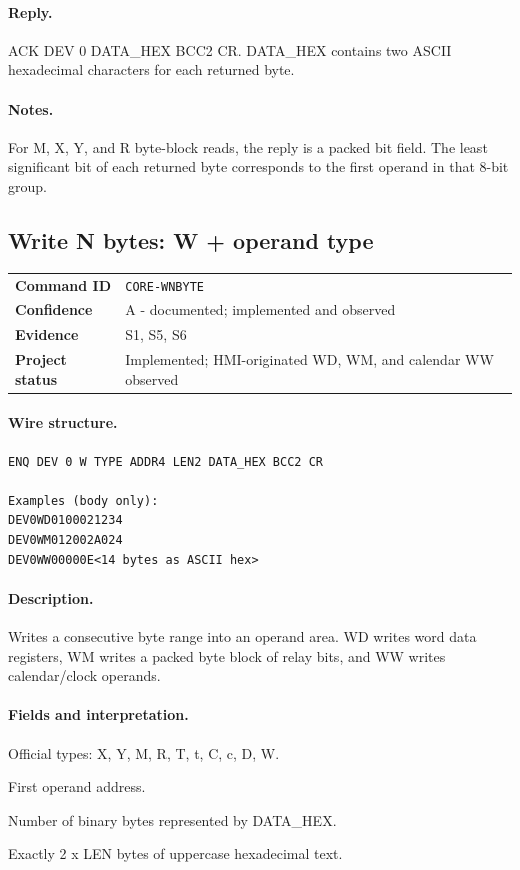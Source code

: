 \documentclass[10pt,letterpaper]{article}
\begin{document}
\paragraph{Reply.} ACK DEV 0 DATA\_HEX BCC2 CR. DATA\_HEX contains two ASCII hexadecimal characters for each returned byte.
\paragraph{Notes.} For M, X, Y, and R byte-block reads, the reply is a packed bit field. The least significant bit of each returned byte corresponds to the first operand in that 8-bit group.

\subsection{Write N bytes: W + operand type}
\begin{tabularx}{\textwidth}{@{}>{\bfseries}p{2.8cm}X@{}}
Command ID & \texttt{CORE-WNBYTE} \\
Confidence & A - documented; implemented and observed \\
Evidence & S1, S5, S6 \\
Project status & Implemented; HMI-originated WD, WM, and calendar WW observed \\
\end{tabularx}
\vspace{0.35em}
\paragraph{Wire structure.}
\begin{Verbatim}[breaklines=true,breakanywhere=true,fontsize=\small]
ENQ DEV 0 W TYPE ADDR4 LEN2 DATA_HEX BCC2 CR

Examples (body only):
DEV0WD0100021234
DEV0WM012002A024
DEV0WW00000E<14 bytes as ASCII hex>
\end{Verbatim}
\paragraph{Description.} Writes a consecutive byte range into an operand area. WD writes word data registers, WM writes a packed byte block of relay bits, and WW writes calendar/clock operands.
\paragraph{Fields and interpretation.}
\begin{description}[style=nextline,leftmargin=3.2cm,labelwidth=3.0cm,font=\normalfont\bfseries]
\item[TYPE] Official types: X, Y, M, R, T, t, C, c, D, W.
\item[ADDR4] First operand address.
\item[LEN2] Number of binary bytes represented by DATA\_HEX.
\item[DATA\_HEX] Exactly 2 x LEN bytes of uppercase hexadecimal text.
\end{description}
\end{document}
